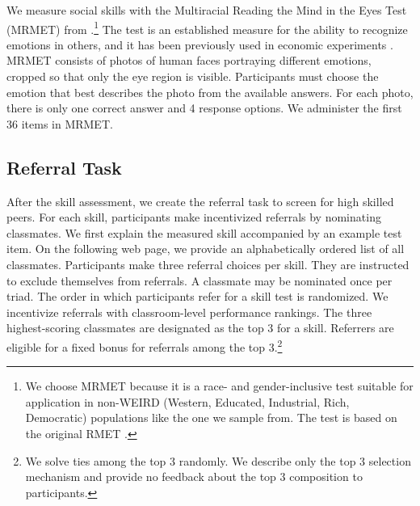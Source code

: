 \documentclass[11pt,a4paper,oneside]{article}
\begin{document}
We measure social skills with the Multiracial Reading the Mind in the Eyes Test (MRMET) from \citet{kim_multiracial_2022}.\footnote{We choose MRMET because it is a race- and gender-inclusive test suitable for application in non-WEIRD (Western, Educated, Industrial, Rich, Democratic) populations like the one we sample from. The test is based on the original RMET \citep{baron-cohen_reading_2001}.} The test is an established measure for the ability to recognize emotions in others, and it has been previously used in economic experiments \citep{van_leeuwen_predictably_2018, weidmann_team_2021}. MRMET consists of photos of human faces portraying different emotions, cropped so that only the eye region is visible. Participants must choose the emotion that best describes the photo from the available answers. For each photo, there is only one correct answer and 4 response options. We administer the first 36 items in MRMET. 
\subsection{Referral Task} \label{referral_task}
After the skill assessment, we create the referral task to screen for high skilled peers. For each skill, participants make incentivized referrals by nominating classmates. We first explain the measured skill accompanied by an example test item. On the following web page, we provide an alphabetically ordered list of all classmates. Participants make three referral choices per skill. They are instructed to exclude themselves from referrals. A classmate may be nominated once per triad. The order in which participants refer for a skill test is randomized. We incentivize referrals with classroom-level performance rankings. The three highest-scoring classmates are designated as the top 3 for a skill. Referrers are eligible for a fixed bonus for referrals among the top 3.\footnote{We solve ties among the top 3 randomly. We describe only the top 3 selection mechanism and provide no feedback about the top 3 composition to participants.} 
\end{document}

